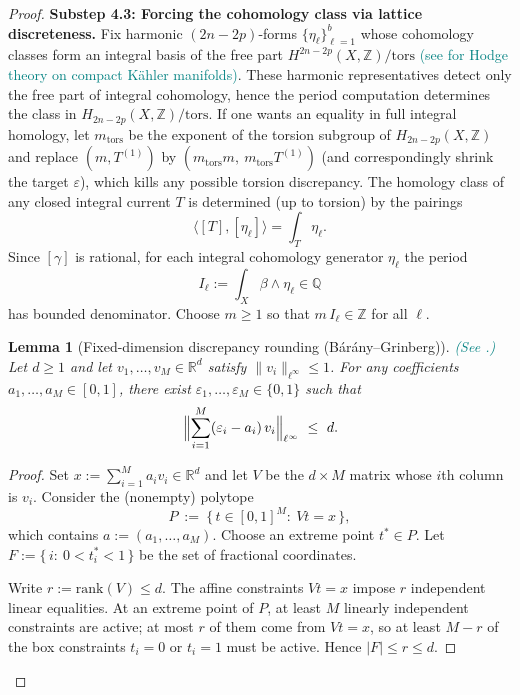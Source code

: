 \documentclass[11pt]{article}
\newcommand{\REVMZ}[1]{\textcolor{teal}{#1}}  %
\numberwithin{equation}{section}  %
\theoremstyle{plain}
\newtheorem{lemma}[theorem]{Lemma}
\theoremstyle{definition}
\theoremstyle{remark}
\newcommand{\R}{\mathbb{R}}
\newcommand{\Z}{\mathbb{Z}}
\newcommand{\Q}{\mathbb{Q}}
\begin{document}
\begin{proof}
\medskip\noindent
\textbf{Substep 4.3: Forcing the cohomology class via lattice discreteness.}
Fix harmonic $(2n-2p)$-forms $\{\eta_\ell\}_{\ell=1}^b$ whose cohomology classes form an integral basis of the free part
$H^{2n-2p}(X,\Z)/\mathrm{tors}$ \REVMZ{(see \cite{GH78,Voisin02} for Hodge theory on compact K\"ahler manifolds)}.
These harmonic representatives detect only the free part of integral cohomology, hence the period computation determines the class in
$H_{2n-2p}(X,\Z)/\mathrm{tors}$.
If one wants an equality in full integral homology, let $m_{\mathrm{tors}}$ be the exponent of the torsion subgroup of $H_{2n-2p}(X,\Z)$ and replace
$(m,T^{(1)})$ by $(m_{\mathrm{tors}}m,\ m_{\mathrm{tors}}T^{(1)})$ (and correspondingly shrink the target $\varepsilon$), which kills any possible torsion discrepancy.
The homology class of any closed integral current $T$ is determined (up to torsion) by the pairings
\[
\langle[T],[\eta_\ell]\rangle=\int_T\eta_\ell.
\]
Since $[\gamma]$ is rational, for each integral cohomology generator $\eta_\ell$
the period
\[
I_\ell:=\int_X \beta\wedge \eta_\ell\in\Q
\]
has bounded denominator.  Choose $m\ge 1$ so that $m\,I_\ell\in\Z$ for all $\ell$.

\begin{lemma}[Fixed-dimension discrepancy rounding (B\'ar\'any--Grinberg)]\label{lem:barany-grinberg}
\REVMZ{(See \cite{BaranyGrinberg81,Schrijver86}.)}
Let $d\ge 1$ and let $v_1,\dots,v_M\in\R^d$ satisfy $\|v_i\|_{\ell^\infty}\le 1$.
For any coefficients $a_1,\dots,a_M\in[0,1]$, there exist $\varepsilon_1,\dots,\varepsilon_M\in\{0,1\}$ such that
\[
\Bigl\|\sum_{i=1}^M (\varepsilon_i-a_i)\,v_i\Bigr\|_{\ell^\infty}\ \le\ d.
\]
\end{lemma}


\begin{proof}
Set $x:=\sum_{i=1}^M a_i v_i\in\R^d$ and let $V$ be the $d\times M$ matrix whose $i$th column is $v_i$.
Consider the (nonempty) polytope
\[
P\ :=\ \bigl\{\,t\in[0,1]^M:\ Vt=x\,\bigr\},
\]
which contains $a:=(a_1,\dots,a_M)$.  Choose an extreme point $t^*\in P$.
Let $F:=\{\,i:\ 0<t_i^*<1\,\}$ be the set of fractional coordinates.

Write $r:=\mathrm{rank}(V)\le d$.  The affine constraints $Vt=x$ impose $r$ independent linear equalities.
At an extreme point of $P$, at least $M$ linearly independent constraints are active; at most $r$ of them come from $Vt=x$,
so at least $M-r$ of the box constraints $t_i=0$ or $t_i=1$ must be active.
Hence $|F|\le r\le d$.


\end{proof}
\end{proof}
\end{document}

